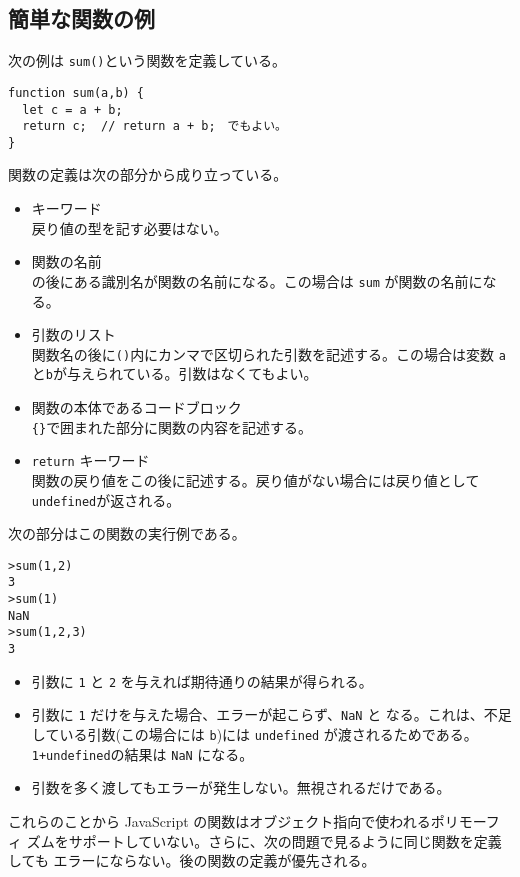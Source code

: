 \subsection{簡単な関数の例}
次の例は \Verb+sum()+という関数を定義している。
\begin{Verbatim}
function sum(a,b) {
  let c = a + b;
  return c;  // return a + b;　でもよい。
}
\end{Verbatim}
関数の定義は次の部分から成り立っている。
\begin{itemize}
 \item {}キーワード\\
戻り値の型を記す必要はない。
 \item 関数の名前\\
 の後にある識別名が関数の名前になる。この場合は \texttt{sum}
       が関数の名前になる。
 \item 引数のリスト\\
関数名の後に\Verb+()+内にカンマで区切られた引数を記述する。この場合は変数
       \Verb+a+と\Verb+b+が与えられている。引数はなくてもよい。
 \item 関数の本体であるコードブロック\\
\Verb+{}+で囲まれた部分に関数の内容を記述する。
\item \Verb+return+ キーワード\\
関数の戻り値をこの後に記述する。戻り値がない場合には戻り値として
       \Verb+undefined+が返される。
\end{itemize}
次の部分はこの関数の実行例である。
\begin{Verbatim}
>sum(1,2)
3
>sum(1)
NaN
>sum(1,2,3)
3
\end{Verbatim} 
\begin{itemize}
 \item 引数に \Verb+1+ と \Verb+2+ を与えれば期待通りの結果が得られる。
 \item 引数に \Verb+1+ だけを与えた場合、エラーが起こらず、\Verb+NaN+ と
       なる。これは、不足している引数(この場合には \Verb+b+)には
       \Verb+undefined+ が渡されるためである。\Verb-1+undefined-の結果は
       \Verb+NaN+ になる。
 \item 引数を多く渡してもエラーが発生しない。無視されるだけである。
\end{itemize}
これらのことから JavaScript の関数はオブジェクト指向で使われるポリモーフィ
ズムをサポートしていない。さらに、次の問題で見るように同じ関数を定義しても
エラーにならない。後の関数の定義が優先される。

